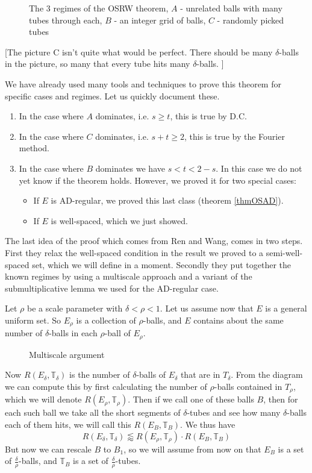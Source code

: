 \documentclass[12pt]{amsart}
\newcommand{\TT}{\mathbb{T}}
\begin{document}
\begin{figure}[h]
  \centering
  
  \caption{The 3 regimes of the OSRW theorem, $A$ - unrelated balls with many tubes through each, $B$ - an integer grid of balls, $C$ - randomly picked tubes}
\end{figure}

[The picture C isn't quite what would be perfect.   There should be many $\delta$-balls in the picture,  so many that every tube hits many $\delta$-balls. ]

We have already used many tools and techniques to prove this theorem for specific cases and regimes. Let us quickly document these.
\begin{enumerate}
  \item In the case where $A$ dominates, i.e. $s \geq t$, this is true by D.C.
  \item In the case where $C$ dominates, i.e. $s + t \geq 2$, this is true by the Fourier method.
  \item In the case where $B$ dominates we have $s < t < 2 - s$. In this case we do not yet know if the theorem holds. However, we proved it for two special cases:
    \begin{itemize}
      \item If $E$ is AD-regular, we proved this last class (theorem \ref{thmOSAD}).
      \item If $E$ is well-spaced, which we just showed.
    \end{itemize}
\end{enumerate}

The last idea of the proof which comes from Ren and Wang, comes in two steps.
First they relax the well-spaced condition in the result we proved to a semi-well-spaced set, which we will define in a moment.
Secondly they put together the known regimes by using a multiscale approach and a variant of the submultiplicative lemma we used for the AD-regular case.

Let $\rho$ be a scale parameter with $\delta < \rho < 1$. Let us assume now that $E$ is a general uniform set.   So $E_\rho$ is a collection of $\rho$-balls,  and $E$ contains about the same number of $\delta$-balls in each $\rho$-ball of $E_\rho$.  


\begin{figure}[h]
  \centering
  
  \caption{Multiscale argument}
\end{figure}

Now $R(E_\delta, \TT_\delta)$ is the number of $\delta$-balls of $E_\delta$ that are in $T_\delta$. From the diagram we can compute this by first calculating the number of $\rho$-balls contained in $T_\rho$, which we will denote $R(E_\rho, \TT_\rho)$. Then if we call one of these balls $B$, then for each such ball we take all the short segments of $\delta$-tubes and see how many $\delta$-balls each of them hits, we will call this $R(E_B,\TT_B)$. We thus have
  \[
  R(E_\delta, \TT_\delta) \lessapprox R(E_\rho, \TT_\rho) \cdot R(E_B, \TT_B)
  \]
But now we can rescale $B$ to $B_1$, so we will assume from now on that $E_B$ is a set of $\frac{\delta}{\rho}$-balls, and $\TT_B$ is a set of $\frac{\delta}{\rho}$-tubes.
\end{document}
